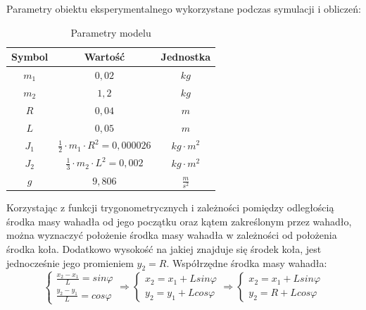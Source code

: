 Parametry obiektu eksperymentalnego wykorzystane podczas symulacji i obliczeń:
    \begin{table}[h!]
        \centering
        \caption{Parametry modelu}
        \label{Parametry}
        \begin{tabular}{|c|c|c|}
              \hline
              Symbol & Wartość & Jednostka\\
              \hline
              $m_1$ & $0,02$ & $kg$\\
              \hline
              $m_2$ & $1,2$ & $kg$\\
              \hline
              $R$ & $0,04$ & $m$\\
              \hline
              $L$ & $0,05$ & $m$\\
              \hline
              $J_1$ & $\frac{1}{2}\cdot m_1 \cdot R^2 = 0,000026$ & $kg \cdot m^2$\\
              \hline
              $J_2$ & $\frac{1}{3}\cdot m_2 \cdot L^2 = 0,002$ & $kg \cdot m^2$\\
              \hline
              $g$ & $9,806$ & $\frac{m}{s^2}$\\
              \hline
        \end{tabular}
    \end{table}

Korzystając z funkcji trygonometrycznych i zależności pomiędzy odległością środka masy wahadła od jego początku oraz kątem zakreślonym przez wahadło, można wyznaczyć położenie środka masy wahadła w zależności od położenia środka koła. Dodatkowo wysokość na jakiej znajduje się środek koła, jest jednocześnie jego promieniem $y_2 = R$. Współrzędne środka masy wahadła:
$$
    \left\{
    \begin{array}{lr}
    \frac{x_2-x_1}{L} = sin\varphi \\
    \frac{y_2-y_1}{L} = cos\varphi
    \end{array}
    \right.
    \Rightarrow
    \left\{
    \begin{array}{lr}
    x_2 = x_1 + Lsin\varphi \\
    y_2 = y_1 + Lcos\varphi
    \end{array}
    \right.
    \Rightarrow
    \left\{
    \begin{array}{lr}
    x_2 = x_1 + Lsin\varphi \\
    y_2 = R + Lcos\varphi
    \end{array}
    \right.
$$

